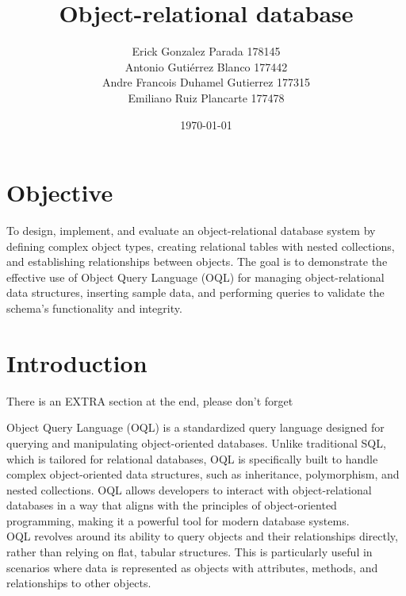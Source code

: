 \documentclass{article}
\begin{document}
\title{Object-relational database}
\author{Erick Gonzalez Parada 178145\\
    Antonio Gutiérrez Blanco 177442\\
    Andre Francois Duhamel Gutierrez 177315\\
    Emiliano Ruiz Plancarte 177478\\ }
\date{\today}

\maketitle

\section{Objective}
\begin{sloppypar}
To design, implement, and evaluate an object-relational database system by defining complex object types, creating relational tables with nested collections, and establishing relationships between objects. The goal is to demonstrate the effective use of Object Query Language (OQL) for managing object-relational data structures, inserting sample data, and performing queries to validate the schema's functionality and integrity.
\end{sloppypar}

\section{Introduction}

\vspace{1cm}

{\Huge{ There is an EXTRA section at the end, please don't forget}}

\vspace{1cm}
Object Query Language (OQL) is a standardized query language designed for querying and manipulating object-oriented databases. Unlike traditional SQL, which is tailored for relational databases, OQL is specifically built to handle complex object-oriented data structures, such as inheritance, polymorphism, and nested collections. OQL allows developers to interact with object-relational databases in a way that aligns with the principles of object-oriented programming, making it a powerful tool for modern database systems\cite{ibm}.
\\
OQL revolves around its ability to query objects and their relationships directly, rather than relying on flat, tabular structures. This is particularly useful in scenarios where data is represented as objects with attributes, methods, and relationships to other objects\cite{mendix}.
\end{document}

